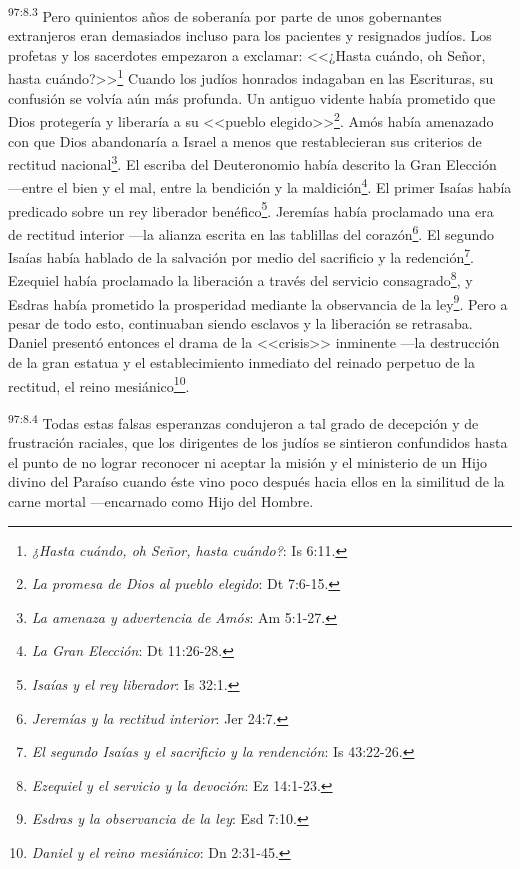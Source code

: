 \par
\textsuperscript{97:8.3} Pero quinientos años de soberanía por parte de unos gobernantes extranjeros eran demasiados incluso para los pacientes y resignados judíos. Los profetas y los sacerdotes empezaron a exclamar: <<¿Hasta cuándo, oh Señor, hasta cuándo?>>\footnote{\textit{¿Hasta cuándo, oh Señor, hasta cuándo?}: Is 6:11.} Cuando los judíos honrados indagaban en las Escrituras, su confusión se volvía aún más profunda. Un antiguo vidente había prometido que Dios protegería y liberaría a su <<pueblo elegido>>\footnote{\textit{La promesa de Dios al pueblo elegido}: Dt 7:6-15.}. Amós había amenazado con que Dios abandonaría a Israel a menos que restablecieran sus criterios de rectitud nacional\footnote{\textit{La amenaza y advertencia de Amós}: Am 5:1-27.}. El escriba del Deuteronomio había descrito la Gran Elección ---entre el bien y el mal, entre la bendición y la maldición\footnote{\textit{La Gran Elección}: Dt 11:26-28.}. El primer Isaías había predicado sobre un rey liberador benéfico\footnote{\textit{Isaías y el rey liberador}: Is 32:1.}. Jeremías había proclamado una era de rectitud interior ---la alianza escrita en las tablillas del corazón\footnote{\textit{Jeremías y la rectitud interior}: Jer 24:7.}. El segundo Isaías había hablado de la salvación por medio del sacrificio y la redención\footnote{\textit{El segundo Isaías y el sacrificio y la rendención}: Is 43:22-26.}. Ezequiel había proclamado la liberación a través del servicio consagrado\footnote{\textit{Ezequiel y el servicio y la devoción}: Ez 14:1-23.}, y Esdras había prometido la prosperidad mediante la observancia de la ley\footnote{\textit{Esdras y la observancia de la ley}: Esd 7:10.}. Pero a pesar de todo esto, continuaban siendo esclavos y la liberación se retrasaba. Daniel presentó entonces el drama de la <<crisis>> inminente ---la destrucción de la gran estatua y el establecimiento inmediato del reinado perpetuo de la rectitud, el reino mesiánico\footnote{\textit{Daniel y el reino mesiánico}: Dn 2:31-45.}.

\par
\textsuperscript{97:8.4} Todas estas falsas esperanzas condujeron a tal grado de decepción y de frustración raciales, que los dirigentes de los judíos se sintieron confundidos hasta el punto de no lograr reconocer ni aceptar la misión y el ministerio de un Hijo divino del Paraíso cuando éste vino poco después hacia ellos en la similitud de la carne mortal ---encarnado como Hijo del Hombre.


